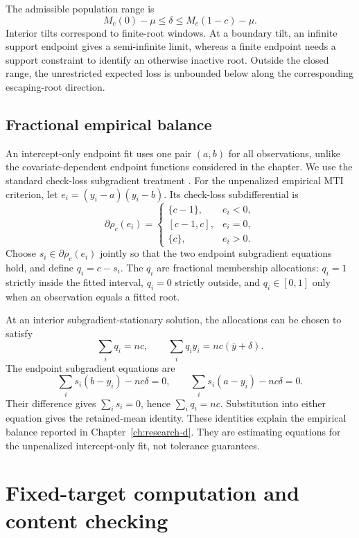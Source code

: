 The admissible population range is
\[
M_c(0)-\mu\le\delta\le M_c(1-c)-\mu.
\]
Interior tilts correspond to finite-root windows. At a boundary tilt, an
infinite support endpoint gives a semi-infinite limit, whereas a finite endpoint needs
a support constraint to identify an otherwise inactive root. Outside the
closed range, the unrestricted expected loss is unbounded below along the
corresponding escaping-root direction.

\subsection{Fractional empirical balance}

An intercept-only endpoint fit uses one pair \((a,b)\) for all observations,
unlike the covariate-dependent endpoint functions considered in the chapter.
We use the standard check-loss subgradient treatment
\citep{qdesn-KoenkerBassett1978}. For the unpenalized empirical MTI criterion, let
\(e_i=(y_i-a)(y_i-b)\). Its check-loss subdifferential is
\[
\partial\rho_c(e_i)=
\begin{cases}
\{c-1\},&e_i<0,\\
[c-1,c],&e_i=0,\\
\{c\},&e_i>0.
\end{cases}
\]
Choose \(s_i\in\partial\rho_c(e_i)\) jointly so that the two endpoint
subgradient equations hold, and define \(q_i=c-s_i\). The \(q_i\) are
fractional membership allocations: \(q_i=1\) strictly inside the fitted
interval, \(q_i=0\) strictly outside, and \(q_i\in[0,1]\) only when an
observation equals a fitted root.

At an interior subgradient-stationary solution, the allocations can be chosen
to satisfy
\[
\sum_iq_i=nc,
\qquad
\sum_iq_iy_i=nc(\overline y+\delta).
\]
The endpoint subgradient equations are
\[
\sum_i s_i(b-y_i)-nc\delta=0,
\qquad
\sum_i s_i(a-y_i)-nc\delta=0.
\]
Their difference gives \(\sum_i s_i=0\), hence \(\sum_iq_i=nc\).
Substitution into either equation gives the retained-mean identity.
These identities explain the empirical balance reported in
Chapter~\ref{ch:research-d}. They are estimating equations for the unpenalized
intercept-only fit, not tolerance guarantees.

\section{Fixed-target computation and content checking}
\label{app:mti-computation}

